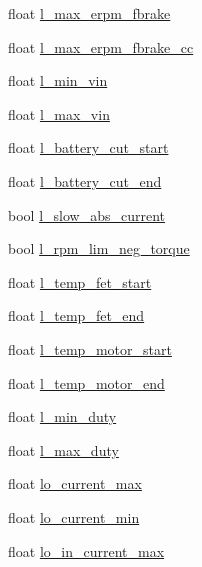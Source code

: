 \begin{DoxyCompactItemize}
\item 
float \hyperlink{structmc__configuration_a52e2a652f509ca16b7ca8c5a77438ac7}{l\+\_\+max\+\_\+erpm\+\_\+fbrake}
\item 
float \hyperlink{structmc__configuration_a55258b3409d6a4183c7ab5f05eda0c5b}{l\+\_\+max\+\_\+erpm\+\_\+fbrake\+\_\+cc}
\item 
float \hyperlink{structmc__configuration_a1ce4b780a12f17319c5a1defc3305794}{l\+\_\+min\+\_\+vin}
\item 
float \hyperlink{structmc__configuration_a5fb012cdba2ef88fcd7e5b8bda58827e}{l\+\_\+max\+\_\+vin}
\item 
float \hyperlink{structmc__configuration_a8dabc758e426163cfab7ea5718231c67}{l\+\_\+battery\+\_\+cut\+\_\+start}
\item 
float \hyperlink{structmc__configuration_a6b2c24b36af0db9e24ba1ee923f8b580}{l\+\_\+battery\+\_\+cut\+\_\+end}
\item 
bool \hyperlink{structmc__configuration_a9a151a98f6a679d95c7bdf854d975380}{l\+\_\+slow\+\_\+abs\+\_\+current}
\item 
bool \hyperlink{structmc__configuration_ab20c0d5436bbaca1ed181a052c449732}{l\+\_\+rpm\+\_\+lim\+\_\+neg\+\_\+torque}
\item 
float \hyperlink{structmc__configuration_a308a67551f12c4d35b591ae3bb4ef160}{l\+\_\+temp\+\_\+fet\+\_\+start}
\item 
float \hyperlink{structmc__configuration_a964e8103e9e1200a63f0cd2fbedf4a9d}{l\+\_\+temp\+\_\+fet\+\_\+end}
\item 
float \hyperlink{structmc__configuration_ae83b30a96031a38d8673ecab5dced683}{l\+\_\+temp\+\_\+motor\+\_\+start}
\item 
float \hyperlink{structmc__configuration_a67aa2cfad7f82694e37f6d94f1e62ffc}{l\+\_\+temp\+\_\+motor\+\_\+end}
\item 
float \hyperlink{structmc__configuration_afd9fb53e51368d7897b5a9a04964ff93}{l\+\_\+min\+\_\+duty}
\item 
float \hyperlink{structmc__configuration_a1b4207ce4dd43bdbe92e6e9107f9cb10}{l\+\_\+max\+\_\+duty}
\item 
float \hyperlink{structmc__configuration_a3a5ac920dcbd768a52ebaecc58ae7302}{lo\+\_\+current\+\_\+max}
\item 
float \hyperlink{structmc__configuration_a13e0eed5b6b3357e623f28c80ff632cd}{lo\+\_\+current\+\_\+min}
\item 
float \hyperlink{structmc__configuration_a1fcbc230c699c0d9c78bdbf6dee5cb37}{lo\+\_\+in\+\_\+current\+\_\+max}

\end{DoxyCompactItemize}

